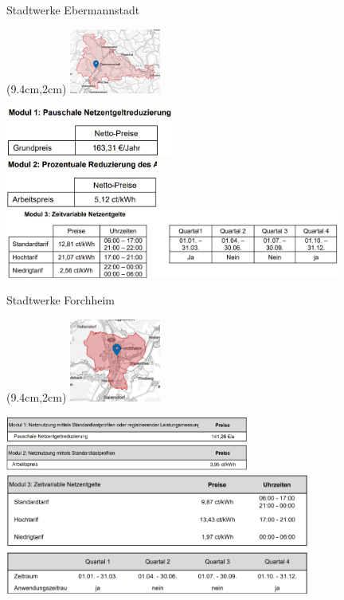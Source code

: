\begin{frame}{Stadtwerke Ebermannstadt}
   \begin{textblock*}{3.3cm}(9.4cm,2cm)
      \includegraphics[width=3cm]{images/Karte_Ebermannstadt.png}
   \end{textblock*}
   \includegraphics[width=5.5cm]{images/Ebermannstadt-Modul1.png}\\
   \includegraphics[width=5cm]{images/Ebermannstadt-Modul2.png}
   \includegraphics[width=11cm]{images/Ebermannstadt-Modul3.png}
\end{frame}

\begin{frame}{Stadtwerke Forchheim}
   \begin{textblock*}{3.3cm}(9.4cm,2cm)
      \includegraphics[width=3cm]{images/Karte_Forchheim.png}
   \end{textblock*}
   \vspace{0.6cm}
   \includegraphics[width=8cm]{images/Forchheim-Modul1.png}
   \includegraphics[width=8cm]{images/Forchheim-Modul2.png}
   \vspace{0.6cm}
   \includegraphics[width=10cm]{images/Forchheim-Modul3.png}
\end{frame}

